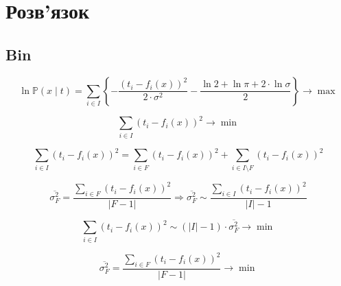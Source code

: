 \section{Розв'язок}

\subsection{Bin}

\begin{equation*}
  \ln{\mathbb{P}\left( x \mid t \right)}
  = \sum_{i \in I}
    \left\{
      - \frac{\left( t_i - f_i\left( x \right) \right)^2}{2 \cdot \sigma^2}
      - \frac{\ln{2} + \ln{\pi} + 2 \cdot \ln{\sigma}}{2}
    \right\}
  \to \max
\end{equation*}

\begin{equation*}
  \sum_{i \in I} \left( t_i - f_i\left( x \right) \right)^2 \to \min
\end{equation*}

\begin{equation*}
  \sum_{i \in I} \left( t_i - f_i\left( x \right) \right)^2
  = \sum_{i \in F} \left( t_i - f_i\left( x \right) \right)^2
  + \sum_{i \in I \setminus F} \left( t_i - f_i\left( x \right) \right)^2
\end{equation*}

\begin{equation*}
    \overline{\sigma_F^2}
    = \frac{\sum\limits_{i \in F} \left( t_i - f_i\left( x \right) \right)^2}
           {\left| F - 1 \right|}
    \Rightarrow
    \overline{\sigma_F^2}
    \sim \frac{\sum\limits_{i \in I}
                 \left( t_i - f_i\left( x \right) \right)^2}
               {\left| I \right| - 1}
\end{equation*}

\begin{equation*}
  \sum_{i \in I} \left( t_i - f_i\left( x \right) \right)^2
  \sim \left( \left| I \right| - 1 \right) \cdot \overline{\sigma_F^2}
  \to \min
\end{equation*}

\begin{equation*}
  \overline{\sigma_F^2}
  = \frac{\sum\limits_{i \in F} \left( t_i - f_i\left( x \right) \right)^2}
         {\left| F - 1 \right|}
  \to \min
\end{equation*}
